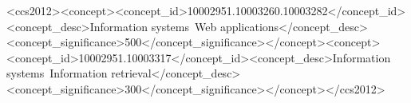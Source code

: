 \documentclass[sigconf,screen,review]{acmart}
\title{\PaperTitle}
\author{\PaperAuthor}
\affiliation{\institution{\PaperAffiliation}\city{\PaperCity}\country{\PaperCountry}}
\author{\SecondAuthor}
\affiliation{\institution{\PaperAffiliation}\city{\PaperCity}\country{\PaperCountry}}
\author{\ThirdAuthor}
\affiliation{\institution{\PaperAffiliation}\city{\PaperCity}\country{\PaperCountry}}
\begin{document}
\begin{abstract}

\end{abstract}
\begin{CCSXML}
<ccs2012><concept><concept_id>10002951.10003260.10003282</concept_id><concept_desc>Information systems~Web applications</concept_desc><concept_significance>500</concept_significance></concept><concept><concept_id>10002951.10003317</concept_id><concept_desc>Information systems~Information retrieval</concept_desc><concept_significance>300</concept_significance></concept></ccs2012>
\end{CCSXML}
\maketitle
\raggedbottom

\balance


\end{document}
